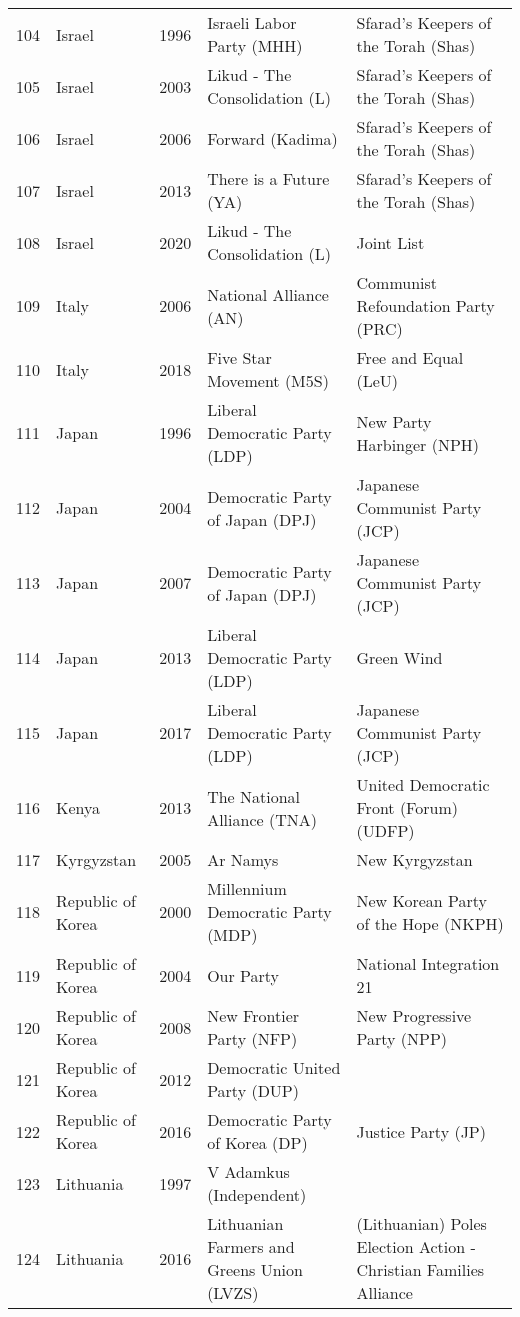 \documentclass[12pt]{article}
\begin{document}
\begin{table}[ht]
\begin{footnotesize}
\begin{tabular}{rllll}
  104 & Israel & 1996 &   Israeli Labor Party (MHH) &   Sfarad's Keepers of the Torah (Shas) \\ 
  105 & Israel & 2003 &   Likud - The Consolidation (L) &   Sfarad's Keepers of the Torah (Shas) \\ 
  106 & Israel & 2006 &   Forward (Kadima) &   Sfarad's Keepers of the Torah (Shas) \\ 
  107 & Israel & 2013 &   There is a Future (YA) &   Sfarad's Keepers of the Torah (Shas) \\ 
  108 & Israel & 2020 &   Likud - The Consolidation (L) &   Joint List \\ 
  109 & Italy & 2006 &   National Alliance (AN) &   Communist Refoundation Party (PRC) \\ 
  110 & Italy & 2018 &   Five Star Movement (M5S) &   Free and Equal (LeU) \\ 
  111 & Japan & 1996 &   Liberal Democratic Party (LDP) &   New Party Harbinger (NPH) \\ 
  112 & Japan & 2004 &   Democratic Party of Japan (DPJ) &   Japanese Communist Party (JCP) \\ 
  113 & Japan & 2007 &   Democratic Party of Japan (DPJ) &   Japanese Communist Party (JCP) \\ 
  114 & Japan & 2013 &   Liberal Democratic Party (LDP) &   Green Wind \\ 
  115 & Japan & 2017 &   Liberal Democratic Party (LDP) &   Japanese Communist Party (JCP) \\ 
  116 & Kenya & 2013 &   The National Alliance (TNA) &   United Democratic Front (Forum) (UDFP) \\ 
  117 & Kyrgyzstan & 2005 &   Ar Namys &   New Kyrgyzstan \\ 
  118 & Republic of Korea & 2000 &   Millennium Democratic Party (MDP) &   New Korean Party of the Hope (NKPH) \\ 
  119 & Republic of Korea & 2004 &   Our Party &   National Integration 21 \\ 
  120 & Republic of Korea & 2008 &   New Frontier Party (NFP) &   New Progressive Party (NPP) \\ 
  121 & Republic of Korea & 2012 &   Democratic United Party (DUP) &  \\ 
  122 & Republic of Korea & 2016 &   Democratic Party of Korea (DP) &   Justice Party (JP) \\ 
  123 & Lithuania & 1997 &   V  Adamkus (Independent) &  \\ 
  124 & Lithuania & 2016 &   Lithuanian Farmers and Greens Union (LVZS) &   (Lithuanian) Poles Election Action - Christian Families Alliance  \\ 

\end{tabular}
\end{footnotesize}
\end{table}
\end{document}
